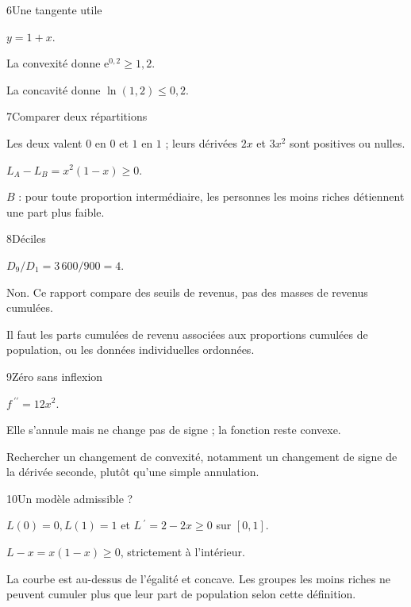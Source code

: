 \begin{corrige}{6}{Une tangente utile}
\begin{questions}
\item $y=1+x$.
\item La convexité donne $\mathrm e^{0{,}2}\geq1{,}2$.
\item La concavité donne $\ln(1{,}2)\leq0{,}2$.
\end{questions}
\end{corrige}
\begin{corrige}{7}{Comparer deux répartitions}
\begin{questions}
\item Les deux valent $0$ en $0$ et $1$ en $1$ ; leurs dérivées $2x$ et $3x^2$ sont positives ou nulles.
\item $L_A-L_B=x^2(1-x)\geq0$.
\item $B$ : pour toute proportion intermédiaire, les personnes les moins riches détiennent une part plus faible.
\end{questions}
\end{corrige}
\begin{corrige}{8}{Déciles}
\begin{questions}
\item $D_9/D_1=3\,600/900=4$.
\item Non. Ce rapport compare des seuils de revenus, pas des masses de revenus cumulées.
\item Il faut les parts cumulées de revenu associées aux proportions cumulées de population, ou les données individuelles ordonnées.
\end{questions}
\end{corrige}
\begin{corrige}{9}{Zéro sans inflexion}
\begin{questions}
\item $f\,\!^{\prime\prime}=12x^2$.
\item Elle s’annule mais ne change pas de signe ; la fonction reste convexe.
\item Rechercher un changement de convexité, notamment un changement de signe de la dérivée seconde, plutôt qu’une simple annulation.
\end{questions}
\end{corrige}
\begin{corrige}{10}{Un modèle admissible ?}
\begin{questions}
\item $L(0)=0,L(1)=1$ et $L\,\!^{\prime}=2-2x\geq0$ sur $[0,1]$.
\item $L-x=x(1-x)\geq0$, strictement à l’intérieur.
\item La courbe est au-dessus de l’égalité et concave. Les groupes les moins riches ne peuvent cumuler plus que leur part de population selon cette définition.
\end{questions}
\end{corrige}
